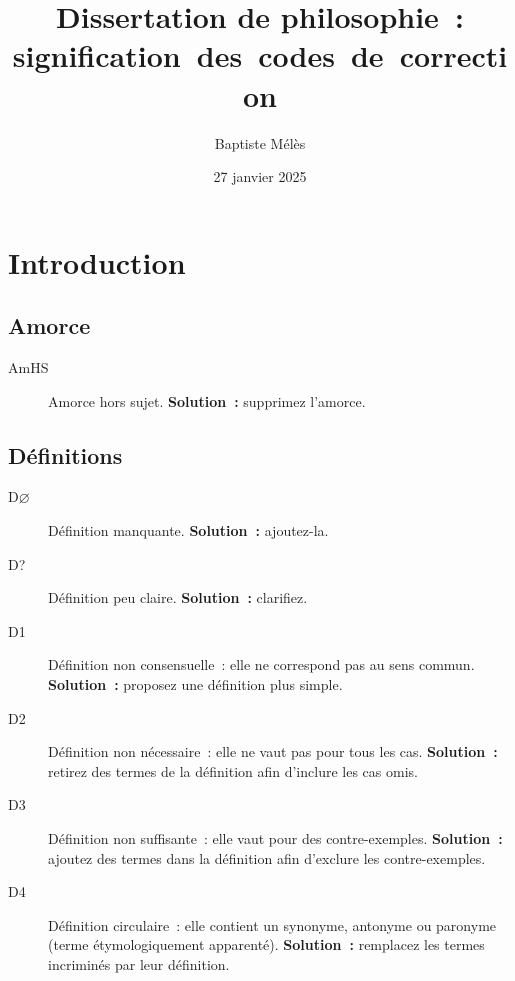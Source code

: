 \documentclass[a4paper,11pt]{article}
\author{Baptiste Mélès}
\date{27 janvier 2025}
\title{Dissertation de philosophie : signification des codes de correction}
\begin{document}
\maketitle

\section{Introduction}
\label{sec:orgcb26b6d}

\subsection{Amorce}
\label{sec:org661a8b8}
\begin{description}
\item[{AmHS}] Amorce hors sujet. \textbf{Solution :} supprimez l'amorce.
\end{description}

\subsection{Définitions}
\label{sec:orgf7941d0}
\begin{description}
\item[{D\(\varnothing\)}] Définition manquante. \textbf{Solution :} ajoutez-la.
\item[{D\string?}] Définition peu claire. \textbf{Solution :} clarifiez.
\item[{D1}] Définition non consensuelle : elle ne correspond pas au sens
commun. \textbf{Solution :} proposez une définition plus simple.
\item[{D2}] Définition non nécessaire : elle ne vaut pas pour tous les cas.
\textbf{Solution :} retirez des termes de la définition afin d'inclure les
cas omis.
\item[{D3}] Définition non suffisante : elle vaut pour des contre-exemples.
\textbf{Solution :} ajoutez des termes dans la définition afin d'exclure les
contre-exemples.
\item[{D4}] Définition circulaire : elle contient un synonyme, antonyme ou
paronyme (terme étymologiquement apparenté). \textbf{Solution :} remplacez
les termes incriminés par leur définition.
\end{description}
\end{document}
